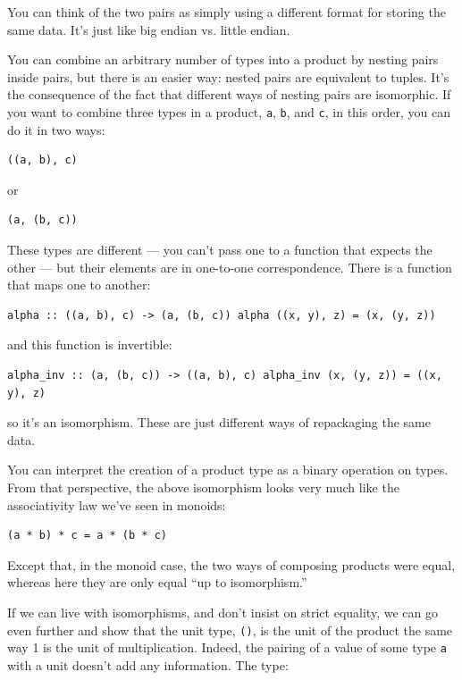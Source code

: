 You can think of the two pairs as simply using a different format for
storing the same data. It's just like big endian vs. little endian.

You can combine an arbitrary number of types into a product by nesting
pairs inside pairs, but there is an easier way: nested pairs are
equivalent to tuples. It's the consequence of the fact that different
ways of nesting pairs are isomorphic. If you want to combine three types
in a product, \texttt{a}, \texttt{b}, and \texttt{c}, in this order, you
can do it in two ways:

\begin{verbatim}
((a, b), c)
\end{verbatim}

or

\begin{verbatim}
(a, (b, c))
\end{verbatim}

These types are different --- you can't pass one to a function that
expects the other --- but their elements are in one-to-one
correspondence. There is a function that maps one to another:

\begin{verbatim}
alpha :: ((a, b), c) -> (a, (b, c)) alpha ((x, y), z) = (x, (y, z))
\end{verbatim}

and this function is invertible:

\begin{verbatim}
alpha_inv :: (a, (b, c)) -> ((a, b), c) alpha_inv (x, (y, z)) = ((x, y), z)
\end{verbatim}

so it's an isomorphism. These are just different ways of repackaging the
same data.

You can interpret the creation of a product type as a binary operation
on types. From that perspective, the above isomorphism looks very much
like the associativity law we've seen in monoids:

\begin{verbatim}
(a * b) * c = a * (b * c)
\end{verbatim}

Except that, in the monoid case, the two ways of composing products were
equal, whereas here they are only equal ``up to isomorphism.''

If we can live with isomorphisms, and don't insist on strict equality,
we can go even further and show that the unit type, \texttt{()}, is the
unit of the product the same way 1 is the unit of multiplication.
Indeed, the pairing of a value of some type \texttt{a} with a unit
doesn't add any information. The type:

